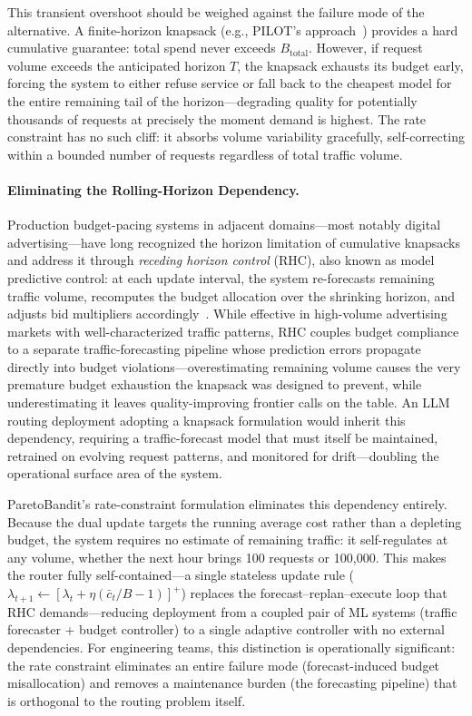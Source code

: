This transient overshoot should be weighed against the failure mode of the alternative.
A finite-horizon knapsack (e.g., PILOT's approach~\cite{panda2025pilot}) provides a hard cumulative guarantee: total spend never exceeds $B_{\mathrm{total}}$.
However, if request volume exceeds the anticipated horizon $T$, the knapsack exhausts its budget early, forcing the system to either refuse service or fall back to the cheapest model for the entire remaining tail of the horizon---degrading quality for potentially thousands of requests at precisely the moment demand is highest.
The rate constraint has no such cliff: it absorbs volume variability gracefully, self-correcting within a bounded number of requests regardless of total traffic volume.

\paragraph{Eliminating the Rolling-Horizon Dependency.}
Production budget-pacing systems in adjacent domains---most notably digital advertising---have long recognized the horizon limitation of cumulative knapsacks and address it through \emph{receding horizon control} (RHC), also known as model predictive control: at each update interval, the system re-forecasts remaining traffic volume, recomputes the budget allocation over the shrinking horizon, and adjusts bid multipliers accordingly~\cite{chen2025budgetpacing}.
While effective in high-volume advertising markets with well-characterized traffic patterns, RHC couples budget compliance to a separate traffic-forecasting pipeline whose prediction errors propagate directly into budget violations---overestimating remaining volume causes the very premature budget exhaustion the knapsack was designed to prevent, while underestimating it leaves quality-improving frontier calls on the table.
An LLM routing deployment adopting a knapsack formulation would inherit this dependency, requiring a traffic-forecast model that must itself be maintained, retrained on evolving request patterns, and monitored for drift---doubling the operational surface area of the system.

ParetoBandit's rate-constraint formulation eliminates this dependency entirely.
Because the dual update targets the running average cost rather than a depleting budget, the system requires no estimate of remaining traffic: it self-regulates at any volume, whether the next hour brings 100 requests or 100{,}000.
This makes the router fully self-contained---a single stateless update rule ($\lambda_{t+1} \leftarrow [\lambda_t + \eta(\bar{c}_t/B - 1)]^+$) replaces the forecast--replan--execute loop that RHC demands---reducing deployment from a coupled pair of ML systems (traffic forecaster + budget controller) to a single adaptive controller with no external dependencies.
For engineering teams, this distinction is operationally significant: the rate constraint eliminates an entire failure mode (forecast-induced budget misallocation) and removes a maintenance burden (the forecasting pipeline) that is orthogonal to the routing problem itself.

